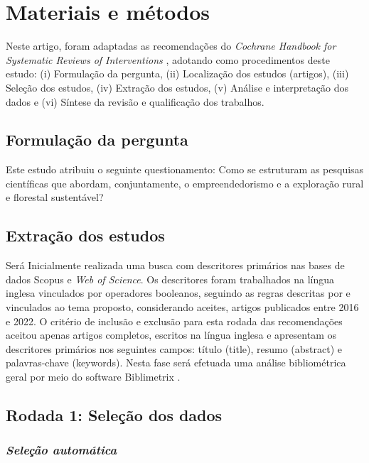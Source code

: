 \section{Materiais e métodos}

Neste artigo, foram adaptadas as recomendações do \textit{Cochrane Handbook for Systematic Reviews of Interventions} \cite{Chandler2021}, adotando como procedimentos deste estudo: (i) Formulação da pergunta, (ii) Localização dos estudos (artigos), (iii) Seleção dos estudos, (iv) Extração dos estudos, (v) Análise e interpretação dos dados e (vi) Síntese da revisão e qualificação dos trabalhos.

\subsection{Formulação da pergunta}

Este estudo atribuiu o seguinte questionamento: 
Como se estruturam as pesquisas científicas que abordam, conjuntamente, o empreendedorismo e a exploração rural e florestal sustentável?

\subsection{Extração dos estudos}

Será Inicialmente realizada uma busca com descritores primários nas bases de dados Scopus e \textit{Web of Science}. Os descritores foram trabalhados na língua inglesa vinculados por operadores booleanos, seguindo as regras descritas por  e vinculados ao tema proposto, considerando aceites, artigos publicados entre 2016 e 2022. O critério de inclusão e exclusão para esta rodada das recomendações aceitou apenas artigos completos, escritos na língua inglesa e apresentam os descritores primários nos seguintes campos: título (title), resumo (abstract) e palavras-chave (keywords). Nesta fase será efetuada uma análise bibliométrica geral por meio do software Biblimetrix \cite{Aria2017}.

\subsection{Rodada 1: Seleção dos dados}

\subsubsection*{\textit{Seleção automática}}

